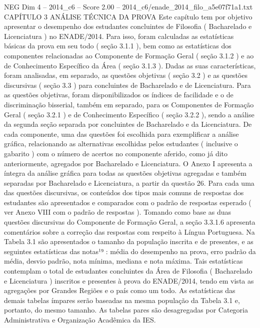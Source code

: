 \begin{textsample}{NEG Dim 4 – 2014\_c6 – Score 2.00 – 2014\_c6/enade\_2014\_filo\_a5e07f71a1.txt}  \label{ex:f4_neg_287}
CAPÍTULO 3 ANÁLISE TÉCNICA DA PROVA Este capítulo tem por objetivo apresentar o desempenho dos estudantes concluintes de Filosofia ( Bacharelado e Licenciatura ) no ENADE/2014.
Para isso, foram calculadas as estatísticas básicas da prova em seu todo ( seção 3.1.1 ), bem como as estatísticas dos componentes relacionadas ao Componente de Formação Geral ( seção 3.1.2 ) e ao de Conhecimento Específico da Área ( seção 3.1.3 ).
Dadas as suas características, foram analisadas, em separado, as questões objetivas ( seção 3.2 ) e as questões discursivas ( seção 3.3 ) para concluintes de Bacharelado e de Licenciatura.
Para as questões objetivas, foram disponibilizados os índices de facilidade e o de discriminação bisserial, também em separado, para os Componentes de Formação Geral ( seção 3.2.1 ) e de Conhecimento Específico ( seção 3.2.2 ), sendo a análise da segunda seção separada por concluintes de Bacharelado e da Licenciatura.
De cada componente, uma das questões foi escolhida para exemplificar a análise gráfica, relacionando as alternativas escolhidas pelos estudantes ( inclusive o gabarito ) com o número de acertos no componente aferido, como já dito anteriormente, agregados por Bacharelado e Licenciatura.
O Anexo I apresenta a íntegra da análise gráfica para todas as questões objetivas agregadas e também separadas por Bacharelado e Licenciatura, a partir da questão 26.
Para cada uma das questões discursivas, os conteúdos dos tipos mais comuns de respostas dos estudantes são apresentados e comparados com o padrão de respostas esperado ( ver Anexo VIII com o padrão de respostas ).
Tomando como base as duas questões discursivas do Componente de Formação Geral, a seção 3.3.1.6 apresenta comentários sobre a correção das respostas com respeito à Língua Portuguesa.
Na Tabela 3.1 são apresentados o tamanho da população inscrita e de presentes, e as seguintes estatísticas das notas¹⁹ : média do desempenho na prova, erro padrão da média, desvio padrão, nota mínima, mediana e nota máxima.
Tais estatísticas contemplam o total de estudantes concluintes da Área de Filosofia ( Bacharelado e Licenciatura ) inscritos e presentes à prova do ENADE/2014, tendo em vista as agregações por Grandes Regiões e o país como um todo.
As estatísticas das demais tabelas ímpares serão baseadas na mesma população da Tabela 3.1 e, portanto, do mesmo tamanho.
As tabelas pares são desagregadas por Categoria Administrativa e Organização Acadêmica da IES.

\end{textsample}
